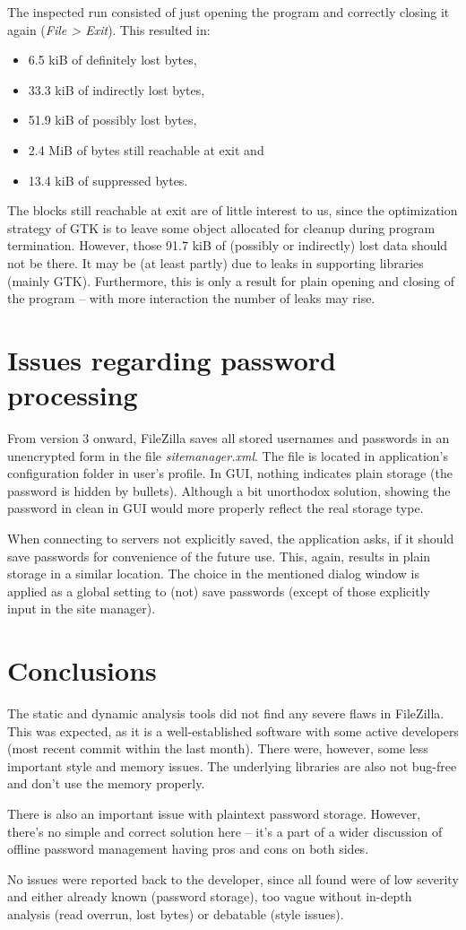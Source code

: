 \documentclass[11pt]{article}
\begin{document}
The inspected run consisted of just opening the program and correctly closing it again (\textit{File > Exit}). This resulted in:
\begin{itemize}[topsep=0pt, itemsep=0pt]
\item 6.5 kiB of definitely lost bytes,
\item 33.3 kiB of indirectly lost bytes,
\item 51.9 kiB of possibly lost bytes,
\item 2.4 MiB of bytes still reachable at exit and
\item 13.4 kiB of suppressed bytes.
\end{itemize}
\noindent
The blocks still reachable at exit are of little interest to us, since the optimization strategy of GTK is to leave some object allocated for cleanup during program termination. However, those 91.7 kiB of (possibly or indirectly) lost data should not be there. It may be (at least partly) due to leaks in supporting libraries (mainly GTK). Furthermore, this is only a result for plain opening and closing of the program -- with more interaction the number of leaks may rise.

\section{Issues regarding password processing}

From version 3 onward, FileZilla saves all stored usernames and passwords in an unencrypted form in the file \textit{sitemanager.xml}. The file is located in application's configuration folder in user's profile. In GUI, nothing indicates plain storage (the password is hidden by bullets). Although a bit unorthodox solution, showing the password in clean in GUI would more properly reflect the real storage type.

When connecting to servers not explicitly saved, the application asks, if it should save passwords for convenience of the future use. This, again, results in plain storage in a similar location. The choice in the mentioned dialog window is applied as a global setting to (not) save passwords (except of those explicitly input in the site manager).

\section{Conclusions}

The static and dynamic analysis tools did not find any severe flaws in FileZilla. This was expected, as it is a well-established software with some active developers (most recent commit within the last month). There were, however, some less important style and memory issues. The underlying libraries are also not bug-free and don't use the memory properly.

There is also an important issue with plaintext password storage. However, there's no simple and correct solution here -- it's a part of a wider discussion of offline password management having pros and cons on both sides.

No issues were reported back to the developer, since all found were of low severity and either already known (password storage), too vague without in-depth analysis (read overrun, lost bytes) or debatable (style issues).
\end{document}

